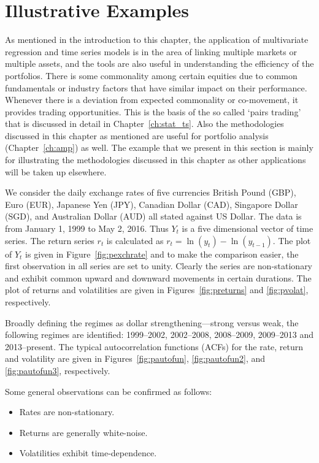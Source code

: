 \section{Illustrative Examples}


As mentioned in the introduction to this chapter, the application of multivariate regression and time series models is in the area of linking multiple markets or multiple assets, and the tools are also useful in understanding the efficiency of the portfolios. There is some commonality among certain equities due to common fundamentals or industry factors that have similar impact on their performance. Whenever there is a deviation from expected commonality or co-movement, it provides trading opportunities. This is the basis of the so called `pairs trading' that is discussed in detail in Chapter~\ref{ch:stat_ts}. Also the methodologies discussed in this chapter as mentioned are useful for portfolio analysis (Chapter~\ref{ch:amp}) as well. The example that we present in this section is mainly for illustrating the methodologies discussed in this chapter as other applications will be taken up elsewhere.


We consider the daily exchange rates of five currencies British Pound (GBP), Euro (EUR), Japanese Yen (JPY), Canadian Dollar (CAD), Singapore Dollar (SGD), and Australian Dollar (AUD) all stated against US Dollar. The data is from January 1, 1999 to May 2, 2016. Thus $Y_t$ is a five dimensional vector of time series. The return series $r_t$ is calculated as $r_t= \ln(y_t) - \ln(y_{t-1})$. The plot of $Y_t$ is given in Figure~\ref{fig:pexchrate} and to make the comparison easier, the first observation in all series are set to unity. Clearly the series are non-stationary and exhibit common upward and downward movements in certain durations. The plot of returns and volatilities are given in Figures~\ref{fig:preturns} and \ref{fig:pvolat}, respectively. 


Broadly defining the regimes as dollar strengthening---strong versus weak, the following regimes are identified: 1999--2002, 2002--2008, 2008--2009, 2009--2013 and 2013--present. The typical autocorrelation functions (ACFs) for the rate, return and volatility are given in Figures~\ref{fig:pautofun}, \ref{fig:pautofun2}, and \ref{fig:pautofun3}, respectively.


Some general observations can be confirmed as follows:
	\begin{itemize}
	\item Rates are non-stationary.
	\item Returns are generally white-noise.
	\item Volatilities exhibit time-dependence.
	\end{itemize}


